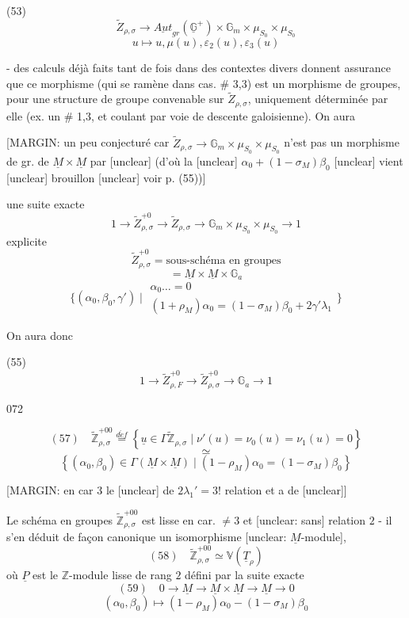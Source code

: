 (53) $$\tilde{Z}_{\rho,\sigma} \longrightarrow \underline{Aut}_{gr} (\underline{\mathbb{G}}^+) \times \mathbb{G}_m \times \mu_{S_0} \times \mu_{S_0}$$
$$u \longmapsto u, \mu(u), \varepsilon_2(u), \varepsilon_3(u)$$

- des calculs déjà faits tant de fois
dans des contextes divers donnent assurance
que ce morphisme (qui se ramène dans
cas. # 3,3) est un morphisme de groupes,
pour une structure de groupe convenable
sur $\tilde{Z}_{\rho,\sigma}$, uniquement déterminée par elle
(ex. un # 1,3, et coulant par voie
de descente galoisienne). On aura

[MARGIN: un peu conjecturé car $\tilde{Z}_{\rho,\sigma} \to \mathbb{G}_m \times \mu_{S_0} \times \mu_{S_0}$ n'est pas un morphisme de gr. de $\underline{M} \times \underline{M}$ par [unclear] (d'où la [unclear] $\alpha_0 + (1-\sigma_M)\beta_0$ [unclear] vient [unclear] brouillon [unclear] voir p. (55))]

une suite exacte
$$1 \longrightarrow \tilde{Z}_{\rho,\sigma}^{+0} \longrightarrow \tilde{Z}_{\rho,\sigma} \longrightarrow \mathbb{G}_m \times \mu_{S_0} \times \mu_{S_0} \longrightarrow 1$$
explicite
$$\tilde{Z}_{\rho,\sigma}^{+0} = \text{sous-schéma en groupes}$$
$$= \underline{M} \times \underline{M} \times \mathbb{G}_a$$
$$\{ (\alpha_0, \beta_0, \gamma') \mid \begin{array}{l} \alpha_0 \dots = 0 \\ (1+\rho_M)\alpha_0 = (1-\sigma_M)\beta_0 + 2\gamma'\lambda_1 \end{array} \}$$

On aura donc

(55) $$1 \longrightarrow \tilde{Z}_{\rho,F}^{+0} \longrightarrow \tilde{Z}_{\rho,\sigma}^{+0} \longrightarrow \mathbb{G}_a \longrightarrow 1$$

\newpage


072

$$ (57) \quad \widetilde{\mathbb{Z}}_{\rho,\sigma}^{+00} \overset{d\acute{e}f}{=} \left\{ \underline{u} \in \Gamma \widetilde{\mathbb{Z}}_{\rho,\sigma} \mid \nu'(u) = \nu_0(u) = \nu_1(u) = 0 \right\} $$
$$ \simeq $$
$$ \left\{ (\alpha_0, \beta_0) \in \Gamma(\underline{M} \times \underline{M}) \mid (1 - \rho_M)\alpha_0 = (1 - \sigma_M)\beta_0 \right\} $$

[MARGIN: en car 3 le [unclear] de $2 \lambda_1' = 3!$ relation et a de [unclear]]

Le schéma en groupes $\widetilde{\mathbb{Z}}_{\rho,\sigma}^{+00}$ est lisse
en car. $\neq 3$
et [unclear: sans] relation $2$ - il s'en déduit de façon canonique
un isomorphisme [unclear: $\underline{M}$-module],
$$ (58) \quad \widetilde{\mathbb{Z}}_{\rho,\sigma}^{+00} \simeq \mathbb{V}(\underline{T}_{\rho}) $$
où $\underline{P}$ est le $\mathbb{Z}$-module lisse de rang $2$
défini par la suite exacte
$$ (59) \quad 0 \longrightarrow \underline{M} \longrightarrow \underline{M} \times \underline{M} \longrightarrow \underline{M} \longrightarrow 0 $$
$$ (\alpha_0, \beta_0) \longmapsto (1-\rho_M)\alpha_0 - (1-\sigma_M)\beta_0 $$

